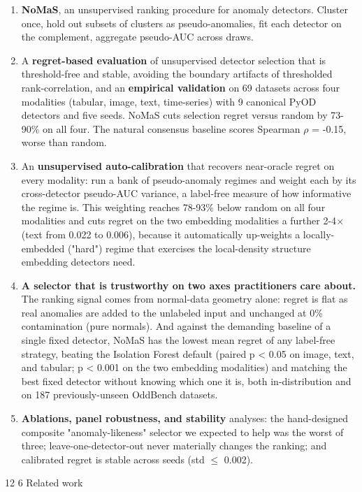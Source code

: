 \documentclass[3p,twocolumn]{elsarticle}
\makeatletter
\renewcommand\section{\@startsection{section}{1}{\z@}%
           {12\p@ \@plus 4\p@ \@minus 4\p@}%
           {6\p@ \@plus 4\p@ \@minus 3\p@}%
           {\normalsize\bfseries\boldmath}}
\makeatother
\begin{document}
\begin{enumerate}
\tightlist
\item
  \textbf{NoMaS}, an unsupervised ranking procedure for anomaly detectors. Cluster once, hold out subsets of clusters as pseudo-anomalies, fit each detector on the complement, aggregate pseudo-AUC across draws.
\item
  A \textbf{regret-based evaluation} of unsupervised detector selection that is threshold-free and stable, avoiding the boundary artifacts of thresholded rank-correlation, and an \textbf{empirical validation} on 69 datasets across four modalities (tabular, image, text, time-series) with 9 canonical PyOD detectors and five seeds. NoMaS cuts selection regret versus random by 73-90\% on all four. The natural consensus baseline scores Spearman $\rho$ = -0.15, worse than random.
\item
  An \textbf{unsupervised auto-calibration} that recovers near-oracle regret on every modality: run a bank of pseudo-anomaly regimes and weight each by its cross-detector pseudo-AUC variance, a label-free measure of how informative the regime is. This weighting reaches 78-93\% below random on all four modalities and cuts regret on the two embedding modalities a further 2-4$\times$ (text from 0.022 to 0.006), because it automatically up-weights a locally-embedded ("hard") regime that exercises the local-density structure embedding detectors need.
\item
  \textbf{A selector that is trustworthy on two axes practitioners care about.} The ranking signal comes from normal-data geometry alone: regret is flat as real anomalies are added to the unlabeled input and unchanged at 0\% contamination (pure normals). And against the demanding baseline of a single fixed detector, NoMaS has the lowest mean regret of any label-free strategy, beating the Isolation Forest default (paired p \textless{} 0.05 on image, text, and tabular; p \textless{} 0.001 on the two embedding modalities) and matching the best fixed detector without knowing which one it is, both in-distribution and on 187 previously-unseen OddBench datasets.
\item
  \textbf{Ablations, panel robustness, and stability} analyses: the hand-designed composite "anomaly-likeness" selector we expected to help was the worst of three; leave-one-detector-out never materially changes the ranking; and calibrated regret is stable across seeds (std $\leq$ 0.002).
\end{enumerate}

\section{Related work}\label{2-related-work}
\end{document}
